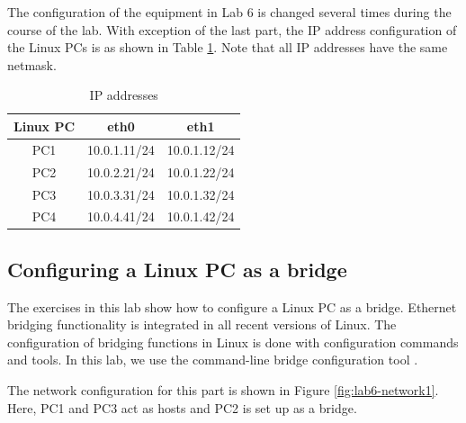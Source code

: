 The configuration of the equipment in Lab 6 is changed several times during the course of the lab. With exception of the last part, the IP address configuration of the Linux PCs is as shown in Table \ref{tab:lab6-network1}. Note that all IP addresses have the same netmask.

\begin{table}[h!t]
\centering
	\begin{tabular}{| c | c | c |}
		\hline
		\textbf{Linux PC} & \textbf{eth0} & \textbf{eth1} \\ \hline
		PC1 & 10.0.1.11/24 & 10.0.1.12/24 \\
		PC2 & 10.0.2.21/24 & 10.0.1.22/24 \\
		PC3 & 10.0.3.31/24 & 10.0.1.32/24 \\
		PC4 & 10.0.4.41/24 & 10.0.1.42/24 \\ \hline
	\end{tabular}
	\caption{IP addresses}
	\label{tab:lab6-network1}
\end{table}

\newpage
\subsection{Configuring a Linux PC as a bridge}

The exercises in this lab show how to configure a Linux PC as a bridge. Ethernet bridging functionality is integrated in all recent versions of Linux. The configuration of bridging functions in Linux is done with configuration commands and tools. In this lab, we use the command-line bridge configuration tool .

The network configuration for this part is shown in Figure \ref{fig:lab6-network1}. Here, PC1 and PC3 act as hosts and PC2 is set up as a bridge.


